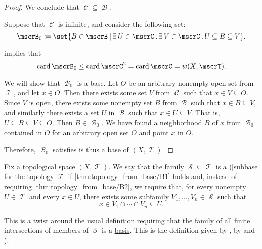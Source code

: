 \begin{proof}
  We conclude that \( \mscrC \subseteq \mscrB \).

   Suppose that \( \mscrC \) is infinite, and consider the following set:
  \begin{equation*}
    \mscrB_0 \coloneqq \set{ B \in \mscrB \given \qexists {U \in \mscrC} \qexists {V \in \mscrC} U \subseteq B \subseteq V }.
  \end{equation*}

   implies that
  \begin{equation*}
    \card\mscrB_0 \leq \card \mscrC^2 = \card \mscrC = w(X, \mscrT).
  \end{equation*}

  We will show that \( \mscrB_0 \) is a base. Let \( O \) be an arbitrary nonempty open set from \( \mscrT \), and let \( x \in O \). Then there exists some set \( V \) from \( \mscrC \) such that \( x \in V \subseteq O \). Since \( V \) is open, there exists some nonempty set \( B \) from \( \mscrB \) such that \( x \in B \subseteq V \), and similarly there exists a set \( U \) in \( \mscrB \) such that \( x \in U \subseteq V \). That is, \( U \subseteq B \subseteq V \subseteq O \). Then \( B \in \mscrB_0 \). We have found a neighborhood \( B \) of \( x \) from \( \mscrB_0 \) contained in \( O \) for an arbitrary open set \( O \) and point \( x \) in \( O \).

  Therefore, \( \mscrB_0 \) satisfies  is thus a base of \( (X, \mscrT) \).
\end{proof}

\begin{definition}\label{def:topological_subbase}
  Fix a topological space \( (X, \mscrT) \). We say that the family \( \mscrS \subseteq \mscrT \) is a \term[ru=предбаза (\cite[def. 4.7]{Александров1977Введение})]{subbase} for the topology \( \mscrT \) if \ref{thm:topology_from_base/B1} holds and, instead of requiring \ref{thm:topology_from_base/B2}, we require that, for every nonempty \( U \in \mscrT \) and every \( x \in U \), there exists some subfamily \( V_1, \ldots, V_n \in \mscrS \) such that
  \begin{equation}\label{eq:def:topological_subbase}
    x \in V_1 \cap \cdots \cap V_n \subseteq U.
  \end{equation}
\end{definition}
\begin{comments}
  \item This is a twist around the usual definition requiring that the family of all finite intersections of members of \( \mscrS \) is a \hyperref[def:topological_base]{basis}. This is the definition given by , by  and ).
\end{comments}

